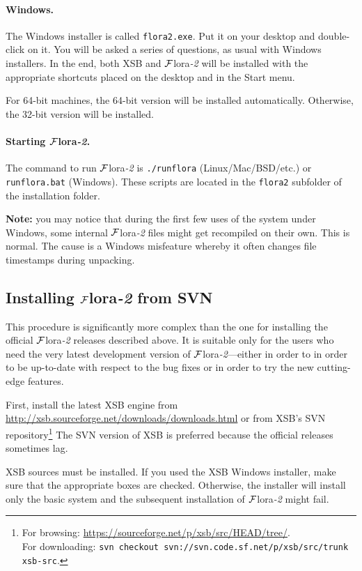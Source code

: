 \documentclass[11pt]{article}
\newcommand{\FLORA}{{\mbox{\sc ${\cal F}${lora}\rm\emph{-2}}}\xspace}
\newcommand{\FLSYSTEM}{\FLORA}
\newcommand{\ENGINERUN}{runflora}
\begin{document}
{\paragraph{Windows.}
The Windows installer is called \texttt{flora2.exe}.
Put it on your desktop and double-click on it. You will be asked a series
of questions, as usual with Windows installers. In the end, both XSB and 
\FLSYSTEM will be installed with the appropriate shortcuts placed on the
desktop and in the Start menu.

For 64-bit machines, the 64-bit version will be installed
automatically. Otherwise, the 32-bit version will be installed.

\paragraph{Starting \FLSYSTEM.}
The command to run \FLSYSTEM is \texttt{./\ENGINERUN} (Linux/Mac/BSD/etc.)
or \texttt{\ENGINERUN.bat} (Windows). These scripts are located in the
\texttt{flora2} subfolder of the installation folder. 

\textbf{Note:} you may notice that during the first few uses of the system
under Windows, some internal \FLSYSTEM files might get recompiled on their
own. This is normal. The cause is a Windows misfeature whereby it often
changes file timestamps during unpacking.


\subsection{Installing \FLSYSTEM from SVN}

This procedure is significantly more complex than the one for installing
the official \FLSYSTEM releases described above. It is suitable only for the
users who need the very latest development version of \FLSYSTEM---either in
order to in order to be up-to-date with respect to the bug fixes or in
order to try the new cutting-edge features.

First, install the latest XSB engine from
\url{http://xsb.sourceforge.net/downloads/downloads.html} or from XSB's SVN
repository\footnote{
  For browsing:
  \url{https://sourceforge.net/p/xsb/src/HEAD/tree/}.
  \\
  \hspace*{7mm}For downloading:
  \texttt{svn~checkout~svn://svn.code.sf.net/p/xsb/src/trunk xsb-src}.
  }
The SVN version of XSB is preferred because the official releases sometimes
lag.

XSB sources must be installed.
If you used the XSB Windows installer,
make sure that the appropriate boxes are checked. Otherwise, the installer
will install only the basic system and the subsequent installation of
\FLSYSTEM might fail.

}
\end{document}

